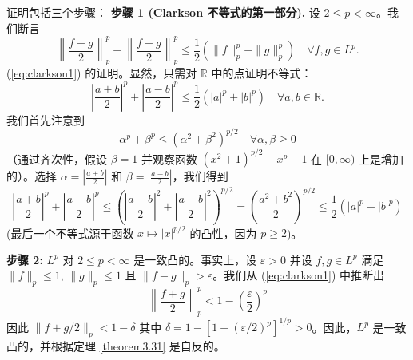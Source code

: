 证明包括三个步骤：
\textbf{步骤 1 (Clarkson 不等式的第一部分).} 设 $2 \le p < \infty$。我们断言
\begin{equation}\label{eq:clarkson1}
\left\| \frac{f+g}{2} \right\|_p^p + \left\| \frac{f-g}{2} \right\|_p^p \le \frac{1}{2}(\|f\|_p^p + \|g\|_p^p) \quad \forall f, g \in L^p.
\end{equation}
(\ref{eq:clarkson1}) 的证明。显然，只需对 $\mathbb{R}$ 中的点证明不等式：
\[ \left| \frac{a+b}{2} \right|^p + \left| \frac{a-b}{2} \right|^p \le \frac{1}{2}(|a|^p + |b|^p) \quad \forall a, b \in \mathbb{R}. \]
我们首先注意到
\[ \alpha^p + \beta^p \le (\alpha^2 + \beta^2)^{p/2} \quad \forall \alpha, \beta \ge 0 \]
（通过齐次性，假设 $\beta=1$ 并观察函数 $(x^2+1)^{p/2} - x^p - 1$ 在 $[0, \infty)$ 上是增加的）。选择 $\alpha = |\frac{a+b}{2}|$ 和 $\beta=|\frac{a-b}{2}|$，我们得到
\[ \left| \frac{a+b}{2} \right|^p + \left| \frac{a-b}{2} \right|^p \le \left( \left| \frac{a+b}{2} \right|^2 + \left| \frac{a-b}{2} \right|^2 \right)^{p/2} = \left( \frac{a^2+b^2}{2} \right)^{p/2} \le \frac{1}{2}(|a|^p + |b|^p) \]
(最后一个不等式源于函数 $x \mapsto |x|^{p/2}$ 的凸性，因为 $p \ge 2$)。

\textbf{步骤 2:} $L^p$ 对 $2 \le p < \infty$ 是一致凸的。事实上，设 $\varepsilon > 0$ 并设 $f, g \in L^p$ 满足 $\|f\|_p \le 1$, $\|g\|_p \le 1$ 且 $\|f-g\|_p > \varepsilon$。我们从 (\ref{eq:clarkson1}) 中推断出
\[ \left\| \frac{f+g}{2} \right\|_p^p < 1 - \left(\frac{\varepsilon}{2}\right)^p \]
因此 $\|f+g/2\|_p < 1-\delta$ 其中 $\delta = 1 - [1 - (\varepsilon/2)^p]^{1/p} > 0$。因此，$L^p$ 是一致凸的，并根据定理 \ref{theorem3.31} 是自反的。


